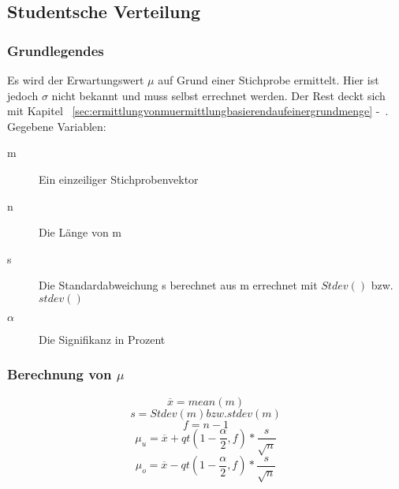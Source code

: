 \documentclass[a4paper,10pt]{article}
\begin{document}
\subsection{Studentsche Verteilung}
\subsubsection{Grundlegendes}
Es wird der Erwartungswert $ \mu $ auf Grund einer Stichprobe ermittelt. Hier
ist jedoch $ \sigma $ nicht bekannt und muss selbst errechnet werden. Der Rest
deckt sich mit Kapitel
~\autoref{sec:ermittlungvonmuermittlungbasierendaufeinergrundmenge}
-~.
\\
Gegebene Variablen:
\begin{description}
\item[m] Ein einzeiliger Stichprobenvektor
\item[n] Die Länge von m
\item[s] Die Standardabweichung s berechnet aus m errechnet mit $
  Stdev() $ bzw. $ stdev() $
\item[$ \alpha $] Die Signifikanz in Prozent
\end{description}

\subsubsection{Berechnung von $ \mu $}
\begin{equation}
  \overline{x} = mean(m)
\end{equation}
\begin{equation}
  s = Stdev(m) bzw. stdev(m)
\end{equation}
\begin{equation}
  f = n -1
\end{equation}
\begin{equation}
  \mu_u = \overline{x} + qt(1 - \frac{\alpha}{2}, f) * \frac{s}{\sqrt{n}}
\end{equation}
\begin{equation}
  \mu_o = \overline{x} - qt(1 - \frac{\alpha}{2}, f) * \frac{s}{\sqrt{n}}
\end{equation}
\end{document}
